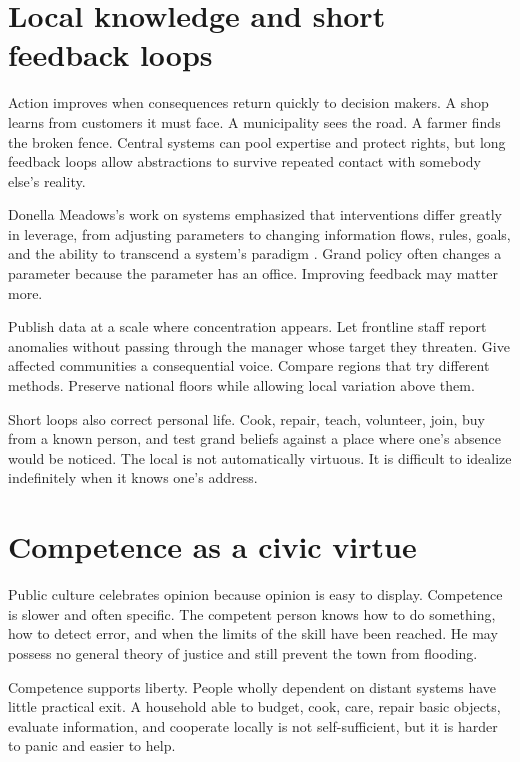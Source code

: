 \documentclass[12pt,a4paper]{book}
\begin{document}
\section{Local knowledge and short feedback loops}

Action improves when consequences return quickly to decision makers.  A shop
learns from customers it must face.  A municipality sees the road.  A farmer
finds the broken fence.  Central systems can pool expertise and protect rights,
but long feedback loops allow abstractions to survive repeated contact with
somebody else's reality.

Donella Meadows's work on systems emphasized that interventions differ greatly
in leverage, from adjusting parameters to changing information flows, rules,
goals, and the ability to transcend a system's paradigm
\cite{MeadowsThinkingSystems2008}.  Grand policy often changes a parameter
because the parameter has an office.  Improving feedback may matter more.

Publish data at a scale where concentration appears.  Let frontline staff
report anomalies without passing through the manager whose target they
threaten.  Give affected communities a consequential voice.  Compare regions
that try different methods.  Preserve national floors while allowing local
variation above them.

Short loops also correct personal life.  Cook, repair, teach, volunteer, join,
buy from a known person, and test grand beliefs against a place where one's
absence would be noticed.  The local is not automatically virtuous.  It is
difficult to idealize indefinitely when it knows one's address.

\section{Competence as a civic virtue}

Public culture celebrates opinion because opinion is easy to display.
Competence is slower and often specific.  The competent person knows how to
do something, how to detect error, and when the limits of the skill have been
reached.  He may possess no general theory of justice and still prevent the
town from flooding.

Competence supports liberty.  People wholly dependent on distant systems have
little practical exit.  A household able to budget, cook, care, repair basic
objects, evaluate information, and cooperate locally is not self-sufficient,
but it is harder to panic and easier to help.
\end{document}
